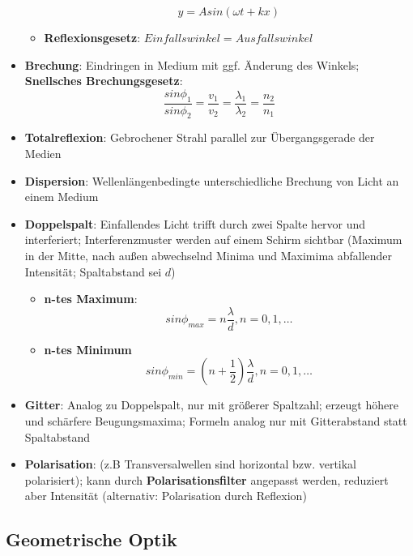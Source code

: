 \begin{itemize}
\begin{itemize}
		\begin{equation}
			y = Asin(\omega t + kx)
		\end{equation}
		\item \textbf{Reflexionsgesetz}: $Einfallswinkel = Ausfallswinkel$
	\end{itemize}
	\item \textbf{Brechung}: Eindringen in Medium mit ggf. Änderung des Winkels; \textbf{Snellsches Brechungsgesetz}:
	\begin{equation}
		\frac{sin\phi_1}{sin\phi_2} = \frac{v_1}{v_2} = \frac{\lambda_1}{\lambda_2} = \frac{n_2}{n_1}
	\end{equation}
	\item \textbf{Totalreflexion}: Gebrochener Strahl parallel zur Übergangsgerade der Medien
	\item \textbf{Dispersion}: Wellenlängenbedingte unterschiedliche Brechung von Licht an einem Medium
	\item \textbf{Doppelspalt}: Einfallendes Licht trifft durch zwei Spalte hervor und interferiert; Interferenzmuster werden auf einem Schirm sichtbar (Maximum in der Mitte, nach außen abwechselnd Minima und Maximima abfallender Intensität; Spaltabstand sei $d$)
	\begin{itemize}
		\item \textbf{n-tes Maximum}:
		\begin{equation}
			sin\phi_{max} = n\frac{\lambda}{d}, n = 0, 1, \dots
		\end{equation}
		\item \textbf{n-tes Minimum}
		\begin{equation}
			sin\phi_{min} = (n + \frac{1}{2})\frac{\lambda}{d}, n = 0, 1, \dots
		\end{equation}		
	\end{itemize}
	\item \textbf{Gitter}: Analog zu Doppelspalt, nur mit größerer Spaltzahl; erzeugt höhere und schärfere Beugungsmaxima; Formeln analog nur mit Gitterabstand statt Spaltabstand
	\item \textbf{Polarisation}:  (z.B Transversalwellen sind horizontal bzw. vertikal polarisiert); kann durch \textbf{Polarisationsfilter} angepasst werden, reduziert aber Intensität (alternativ: Polarisation durch Reflexion)
\end{itemize}

\subsection{Geometrische Optik}%
\label{well:sub:geometrische_optik}

